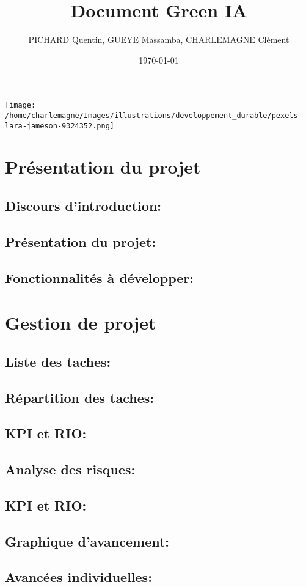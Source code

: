 \documentclass[11pt]{article}
\title{Document Green IA}
\author{PICHARD Quentin, GUEYE Massamba, CHARLEMAGNE Clément}
\date{\today}
\begin{document}
\maketitle

\begin{center}
    \texttt{[image: /home/charlemagne/Images/illustrations/developpement\_durable/pexels-lara-jameson-9324352.png]}
\end{center}

\section{\textcolor{section}{Présentation du projet\\}}
\subsection*{\textcolor{sub_section}{Discours d'introduction:}}
\subsection*{\textcolor{sub_section}{Présentation du projet:}}
\subsection*{\textcolor{sub_section}{Fonctionnalités à développer:}}

\section{\textcolor{section}{Gestion de projet\\}}
\subsection*{\textcolor{sub_section}{Liste des taches:}}
\subsection*{\textcolor{sub_section}{Répartition des taches:}}
\subsection*{\textcolor{sub_section}{KPI et RIO:}}
\subsection*{\textcolor{sub_section}{Analyse des risques:}}
\subsection*{\textcolor{sub_section}{KPI et RIO:}}
\subsection*{\textcolor{sub_section}{Graphique d'avancement:}}
\subsection*{\textcolor{sub_section}{Avancées individuelles:}}
\end{document}
